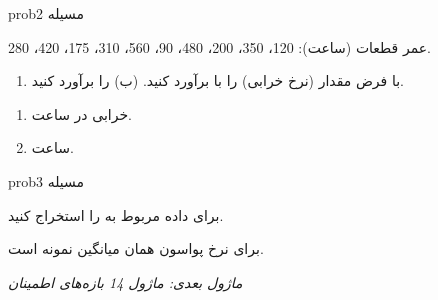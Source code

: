 \begin{PSbox}[unbreakable]{prob}{مسیله 2}

عمر قطعات (ساعت): 120، 350، 200، 480، 90، 560، 310، 175، 420، 280.

\begin{enumerate}
\def\labelenumi{(\PSalph{enumi})}
\tightlist
\item
  با فرض  مقدار \lr{$\lambda$} (نرخ خرابی) را با  برآورد کنید. (ب)  را برآورد کنید.
\end{enumerate}

\PSsolution{} 

\begin{enumerate}
\def\labelenumi{(\PSalph{enumi})}
\tightlist
\item
  \PSbr{} خرابی در ساعت.
\item
   ساعت.
\end{enumerate}

\end{PSbox}

\begin{PSbox}[unbreakable]{prob}{مسیله 3}

برای داده  مربوط به \lr{$\lambda$} را استخراج کنید.

\PSsolution{} \PSbr{}\PSbr{} برای نرخ پواسون همان میانگین نمونه است.

\emph{ماژول بعدی: {ماژول 14  بازه‌های اطمینان}}

\end{PSbox}
